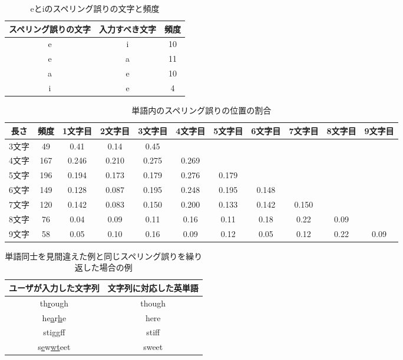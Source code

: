  \begin{table}[t]
  \small
  \begin{center}
   \caption{eとiのスペリング誤りの文字と頻度}
   \begin{tabular}{|c|c|c|} \hline
       	スペリング誤りの文字 & 入力すべき文字 & 頻度\\ \hline
	    e & i & 10\\ \hline
	    e & a & 11\\ \hline
	    a & e & 10\\ \hline
	    i & e & 4\\ \hline
   \end{tabular}
  \end{center}
 \end{table}

 \begin{table}[t]
  \small
  \begin{center}
   \caption{単語内のスペリング誤りの位置の割合}
   \begin{tabular}{|c|c|c|c|c|c|c|c|c|c|c|} \hline
       	長さ & 頻度 & 1文字目 & 2文字目 & 3文字目 & 4文字目 & 5文字目 & 6文字目 & 7文字目 & 8文字目 & 9文字目\\ \hline
	    3文字 & 49 & 0.41 & 0.14 & 0.45 &  &  &  &  &  & \\ \hline
	    4文字 & 167 & 0.246 & 0.210 & 0.275 & 0.269 &  &  &  &  & \\ \hline
	    5文字 & 196 & 0.194 & 0.173 & 0.179 & 0.276 & 0.179 &  &  &  & \\ \hline
	    6文字 & 149 & 0.128 & 0.087 & 0.195 & 0.248 & 0.195 & 0.148 &  &  & \\ \hline
	    7文字 & 120 & 0.142 & 0.083 & 0.150 & 0.200 & 0.133 & 0.142 & 0.150 &  & \\ \hline
	    8文字 & 76 & 0.04 & 0.09 & 0.11 & 0.16 & 0.11 & 0.18 & 0.22 & 0.09 & \\ \hline
	    9文字 & 58 & 0.05 & 0.10 & 0.16 & 0.09 & 0.12 & 0.05 & 0.12 & 0.22 & 0.09 \\ \hline
   \end{tabular}
  \end{center}
 \end{table}

 \begin{table*}[t]
  \small
  \begin{center}
   \caption{単語同士を見間違えた例と同じスペリング誤りを繰り返した場合の例}
   \begin{tabular}{|c|c|} \hline
       	ユーザが入力した文字列 & 文字列に対応した英単語\\ \hline
	    th\underline{r}ough & though\\ \hline
	    he\underline{a}r\underline{h}e & here\\ \hline
	    sti\underline{gg}ff & stiff\\ \hline
	    s\underline{e}w\underline{wt}eet & sweet\\ \hline
   \end{tabular}
  \end{center}
 \end{table*}
